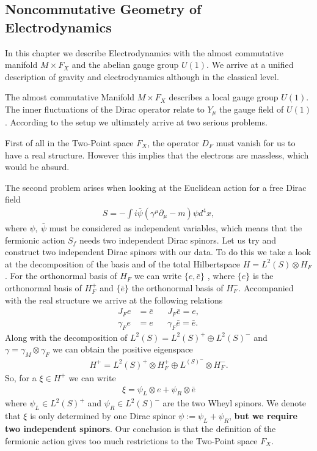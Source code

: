 \subsection{Noncommutative Geometry of Electrodynamics}
In this chapter we describe Electrodynamics with the almost commutative
manifold $M\times F_X$ and the abelian gauge group $U(1)$.
We arrive at a unified description of gravity and electrodynamics although in the classical level.

The almost commutative Manifold $M\times F_X$ describes a local gauge group
$U(1)$. The inner fluctuations of the Dirac operator relate to $Y_\mu$ the
gauge field of $U(1)$. According to the setup we ultimately arrive at two
serious problems.

First of all in the Two-Point space $F_X$, the operator $D_F$ must vanish for
us to have a real structure. However this implies that the electrons
are massless, which would be absurd.

The second problem arises when looking at the Euclidean action for a free
Dirac field
\begin{align}
    S = - \int i \bar{\psi}(\gamma ^\mu\partial _\mu - m) \psi d^4x,
\end{align}
where $\psi,\ \bar{\psi}$ must be considered as independent variables, which
means that the fermionic action $S_f$ needs two independent Dirac spinors.
Let us try and construct two independent Dirac spinors with our data. To do
this we take a look at the decomposition of the basis and of the total
Hilbertspace $H = L^2(S) \otimes H_F$. For the orthonormal basis of $H_F$ we
can write $\{e, \bar{e}\}$ , where $\{e\}$ is the orthonormal basis of
$H_F^+$ and $\{\bar{e}\}$ the orthonormal basis of $H_F^-$. Accompanied with
the real structure we arrive at the following relations
\begin{align}
    J_F e &= \bar{e} \;\;\;\;\;\; J_F \bar{e} = e, \\
    \gamma_F e &= e  \;\;\;\;\;\;   \gamma_F \bar{e} = \bar{e}.
\end{align}
Along with the decomposition of $L^2(S) = L^2(S)^+ \oplus L^2(S)^-$ and  $\gamma = \gamma _M
\otimes \gamma _F$ we can obtain the positive eigenspace
\begin{align}
    H^+ = L^2(S)^+ \otimes H_F^+ \oplus L^(S)^- \otimes H_F^-.
\end{align}
So, for a $\xi \in H^+$ we can write
\begin{align}
    \xi = \psi _L \otimes e + \psi _R \otimes \bar{e}
\end{align}
where $\psi_L \in L^2(S)^+$ and $\psi _R \in L^2(S)^-$ are the two Wheyl
spinors. We denote that $\xi$ is only determined by one Dirac spinor $\psi :=
\psi_L + \psi _R$, \textbf{but we require two independent spinors}. Our
conclusion is that the definition of the fermionic action gives too much
restrictions to the Two-Point space $F_X$.
